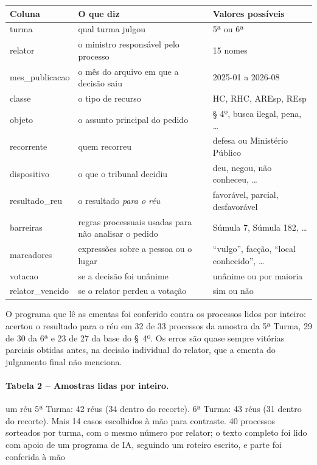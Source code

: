 \begin{center}\small
\begin{tabular}{>{\ttfamily}l p{6.6cm} p{5cm}}
\toprule
\normalfont\bfseries Coluna & \bfseries O que diz & \bfseries Valores possíveis \\
\midrule
turma & qual turma julgou & 5ª ou 6ª \\
relator & o ministro responsável pelo processo & 15 nomes \\
mes\_publicacao & o mês do arquivo em que a decisão saiu & 2025-01 a 2026-08 \\
classe & o tipo de recurso & HC, RHC, AREsp, REsp \\
objeto & o assunto principal do pedido & § 4º, busca ilegal, pena, \ldots \\
recorrente & quem recorreu & defesa ou Ministério Público \\
dispositivo & o que o tribunal decidiu & deu, negou, não conheceu, \ldots \\
resultado\_reu & o resultado \emph{para o réu} & favorável, parcial, desfavorável \\
barreiras & regras processuais usadas para não analisar o pedido & Súmula 7, Súmula 182, \ldots \\
marcadores & expressões sobre a pessoa ou o lugar & ``vulgo'', facção, ``local conhecido'', \ldots \\
votacao & se a decisão foi unânime & unânime ou por maioria \\
relator\_vencido & se o relator perdeu a votação & sim ou não \\
\bottomrule
\end{tabular}
\end{center}

O programa que lê as ementas foi conferido contra os processos lidos por inteiro: acertou
o resultado para o réu em 32 de 33 processos da amostra da 5ª Turma, 29 de 30 da 6ª e 23 de
27 da base do §~4º. Os erros são quase sempre vitórias parciais obtidas antes, na decisão
individual do relator, que a ementa do julgamento final não menciona.

\paragraph*{Tabela 2 -- Amostras lidas por inteiro.}
      {um réu}
      {5ª Turma: 42 réus (34 dentro do recorte). 6ª Turma: 43 réus (31 dentro do recorte). Mais 14 casos escolhidos à mão para contraste.}
      {40 processos sorteados por turma, com o mesmo número por relator; o texto completo foi lido com apoio de um programa de IA, seguindo um roteiro escrito, e parte foi conferida à mão}

